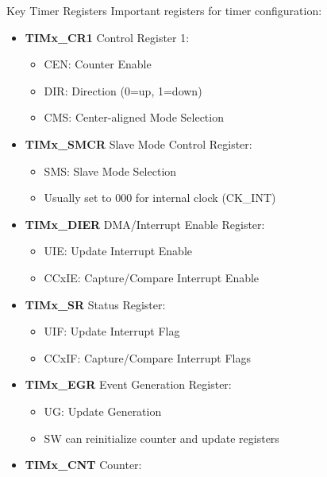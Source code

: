 \begin{theorem}{Key Timer Registers}
Important registers for timer configuration:

\begin{minipage}{0.5\linewidth}
\begin{itemize}
    \item \textbf{TIMx\_CR1} Control Register 1:
    \begin{itemize}
        \item CEN: Counter Enable
        \item DIR: Direction (0=up, 1=down)
        \item CMS: Center-aligned Mode Selection
    \end{itemize}
    \item \textbf{TIMx\_SMCR} Slave Mode Control Register:
    \begin{itemize}
        \item SMS: Slave Mode Selection
        \item Usually set to 000 for internal clock (CK\_INT)
    \end{itemize}
    \item \textbf{TIMx\_DIER} DMA/Interrupt Enable Register:
    \begin{itemize}
        \item UIE: Update Interrupt Enable
        \item CCxIE: Capture/Compare Interrupt Enable
    \end{itemize}
    \item \textbf{TIMx\_SR} Status Register:
    \begin{itemize}
        \item UIF: Update Interrupt Flag
        \item CCxIF: Capture/Compare Interrupt Flags
    \end{itemize}
\end{itemize}
\end{minipage}
\begin{minipage}{0.5\linewidth}
\begin{itemize}
    \item \textbf{TIMx\_EGR} Event Generation Register:
    \begin{itemize}
        \item UG: Update Generation
        \item SW can reinitialize counter and update registers
    \end{itemize}
    \item \textbf{TIMx\_CNT} Counter:

\end{itemize}
\end{minipage}
\end{theorem}
